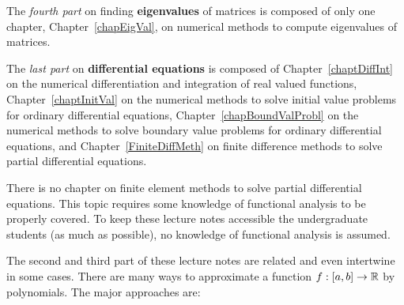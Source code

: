 The {\em fourth part} on finding {\bfseries eigenvalues} of matrices
is composed of only one chapter, Chapter~\ref{chapEigVal}, on
numerical methods to compute eigenvalues of \nn matrices.

The {\em last part} on {\bfseries differential equations} is
composed of Chapter~\ref{chaptDiffInt} on the numerical
differentiation and integration of real valued functions,
Chapter~\ref{chaptInitVal} on the numerical methods to solve initial
value problems for ordinary differential equations,
Chapter~\ref{chapBoundValProbl} on the numerical methods to solve
boundary value problems for ordinary differential equations, and
Chapter~\ref{FiniteDiffMeth} on finite difference methods to solve
partial differential equations.

There is no chapter on finite element methods to solve partial
differential equations.  This topic requires some knowledge of
functional analysis to be properly covered.  To keep these lecture
notes accessible the undergraduate students (as much as possible), no
knowledge of functional analysis is assumed. 

The second and third part of these lecture notes are related and even
intertwine in some cases.  There are many ways to approximate a
function $f:[a,b] \rightarrow \mathbb{R}$ by polynomials.  The major
approaches are:

